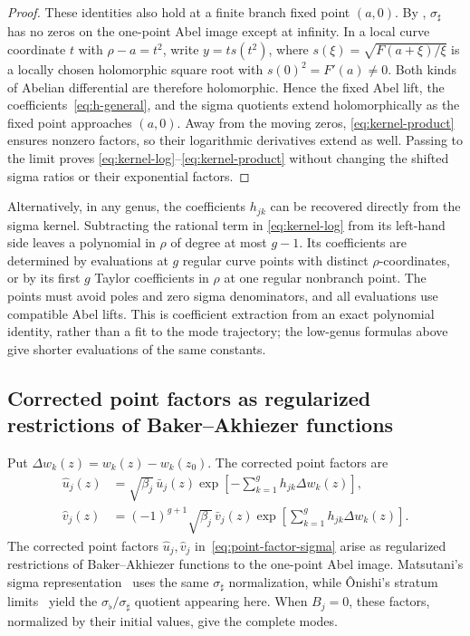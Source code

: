 \documentclass[11pt]{article}
\begin{document}
\begin{proof}
These identities also hold at a finite branch fixed point $(a,0)$.
By \cite[Proposition~6.6(1)]{onishi}, $\sigma_\sharp$ has no zeros on
the one-point Abel image except at infinity. In a local curve coordinate
$t$ with $\rho-a=t^2$, write $y=t s(t^2)$, where
$s(\xi)=\sqrt{F(a+\xi)/\xi}$ is a locally chosen holomorphic square
root with $s(0)^2=F'(a)\ne0$. Both kinds of Abelian differential
are therefore holomorphic. Hence the fixed Abel lift, the
coefficients~\eqref{eq:h-general}, and the sigma quotients extend
holomorphically as the fixed point approaches $(a,0)$. Away from the
moving zeros, \eqref{eq:kernel-product} ensures nonzero factors, so their
logarithmic derivatives extend as well. Passing to the limit proves
\eqref{eq:kernel-log}--\eqref{eq:kernel-product} without changing the
shifted sigma ratios or their exponential factors.
\end{proof}

Alternatively, in any genus, the coefficients $h_{jk}$ can be recovered directly from the sigma kernel. Subtracting the rational term in \eqref{eq:kernel-log} from its left-hand side leaves a polynomial in $\rho$ of degree at most $g-1$. Its coefficients are determined by evaluations at $g$ regular curve points with distinct $\rho$-coordinates, or by its first $g$ Taylor coefficients in $\rho$ at one regular nonbranch point. The points must avoid poles and zero sigma denominators, and all evaluations use compatible Abel lifts. This is coefficient extraction from an exact polynomial identity, rather than a fit to the mode trajectory; the low-genus formulas above give shorter evaluations of the same constants.

\subsection{Corrected point factors as regularized restrictions of Baker--Akhiezer functions}\label{sec:corrected-point-factors}

Put $\Delta w_k(z)=w_k(z)-w_k(z_0)$. The corrected point factors are
\begin{equation}\label{eq:point-factor-sigma}
\begin{aligned}
\widehat u_j(z)&=\sqrt{\beta_j}\,\bar u_j(z)
\exp\!\left[-\sum_{k=1}^g h_{jk}\Delta w_k(z)\right],\\
\widehat v_j(z)&=(-1)^{g+1}\sqrt{\beta_j}\,\bar v_j(z)
\exp\!\left[\sum_{k=1}^g h_{jk}\Delta w_k(z)\right].
\end{aligned}
\end{equation}
The corrected point factors $\widehat u_j,\widehat v_j$
in~\eqref{eq:point-factor-sigma} arise as regularized restrictions of
Baker--Akhiezer functions to the one-point Abel image. Matsutani's sigma
representation~\cite[Section~4.2.2.3, Eq.~(4.42)]{matsutani-book} uses the
same $\sigma_\sharp$ normalization, while \^Onishi's stratum
limits~\cite[Proposition~6.6]{onishi} yield the
$\sigma_\flat/\sigma_\sharp$ quotient appearing here. When $B_j=0$,
these factors, normalized by their initial values, give the complete modes.
\end{document}
